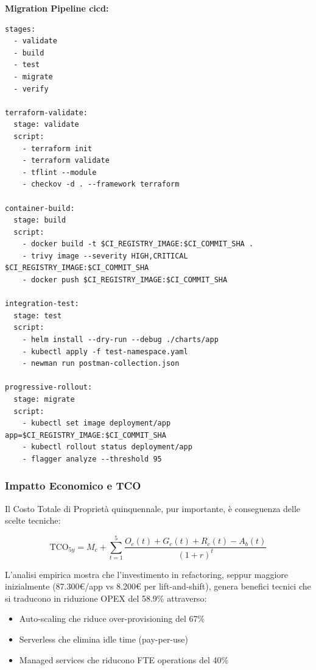 \textbf{Migration Pipeline \gls{cicd}:}
\begin{lstlisting}[caption={GitLab CI per Migrazione Progressiva},label={lst:migration_pipeline}]
stages:
  - validate
  - build
  - test
  - migrate
  - verify

terraform-validate:
  stage: validate
  script:
    - terraform init
    - terraform validate
    - tflint --module
    - checkov -d . --framework terraform

container-build:
  stage: build
  script:
    - docker build -t $CI_REGISTRY_IMAGE:$CI_COMMIT_SHA .
    - trivy image --severity HIGH,CRITICAL $CI_REGISTRY_IMAGE:$CI_COMMIT_SHA
    - docker push $CI_REGISTRY_IMAGE:$CI_COMMIT_SHA

integration-test:
  stage: test
  script:
    - helm install --dry-run --debug ./charts/app
    - kubectl apply -f test-namespace.yaml
    - newman run postman-collection.json

progressive-rollout:
  stage: migrate
  script:
    - kubectl set image deployment/app app=$CI_REGISTRY_IMAGE:$CI_COMMIT_SHA
    - kubectl rollout status deployment/app
    - flagger analyze --threshold 95
\end{lstlisting}

\subsubsection{\texorpdfstring{Impatto Economico e TCO}{3.4.1.4 - Impatto Economico e TCO}}

Il Costo Totale di Proprietà quinquennale, pur importante, è conseguenza delle scelte tecniche:

\begin{equation}
\text{TCO}_{5y} = M_c + \sum_{t=1}^{5} \frac{O_c(t) + G_c(t) + R_c(t) - A_b(t)}{(1+r)^t}
\end{equation}

L'analisi empirica mostra che l'investimento in refactoring, seppur maggiore inizialmente (87.300€/app vs 8.200€ per lift-and-shift), genera benefici tecnici che si traducono in riduzione OPEX del 58.9\% attraverso:
\begin{itemize}
    \item Auto-scaling che riduce over-provisioning del 67\%
    \item Serverless che elimina idle time (pay-per-use)
    \item Managed services che riducono FTE operations del 40\%
\end{itemize}

